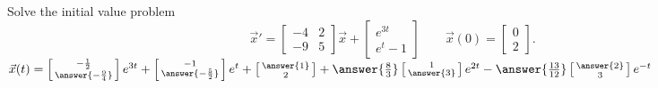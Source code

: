 \documentclass{ximera}
\begin{document}
\begin{exercise}
Solve the initial value problem
\[ 
    {\vec{x}}' = 
    \begin{bmatrix} 
        -4 & 2 \\ 
        -9 & 5 
    \end{bmatrix}
    \vec{x} + 
    \begin{bmatrix} 
        e^{3t} \\ 
        e^t - 1 
    \end{bmatrix} 
    \qquad \vec{x}(0) = 
    \begin{bmatrix} 
        0 \\ 
        2 
    \end{bmatrix}. 
\]
$\vec{x}(t) = \left[\begin{smallmatrix} -\frac{1}{2} \\ \answer{-\frac{9}{4}} \end{smallmatrix}\right]e^{3t} + \left[\begin{smallmatrix} -1 \\ \answer{-\frac{5}{2}} \end{smallmatrix}\right]e^t + \left[\begin{smallmatrix} \answer{1} \\ 2 \end{smallmatrix}\right] + \answer{\frac{8}{3}}\left[\begin{smallmatrix} 1 \\ \answer{3} \end{smallmatrix}\right]e^{2t} - \answer{\frac{13}{12}} \left[\begin{smallmatrix} \answer{2} \\ 3 \end{smallmatrix}\right]e^{-t}$
\end{exercise}
\end{document}
